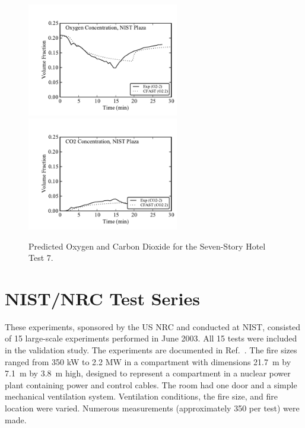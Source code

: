 \begin{figure}[p]
\begin{center}
\includegraphics[width=2.6in]{FIGURES/NIST_PLAZA/Room_2_Oxygen} \\
\includegraphics[width=2.6in]{FIGURES/NIST_PLAZA/Room_2_CO2} 
\end{center}
\caption{Predicted Oxygen and Carbon Dioxide for the Seven-Story Hotel Test 7.} \label{fig:NIST_PLAZA_Gases}
\end{figure}

\clearpage

\section{NIST/NRC Test Series}

These experiments, sponsored by the US NRC and conducted at NIST, consisted of 15 large-scale experiments performed in June 2003. All 15 tests were included in the validation study. The experiments are documented in Ref.~\cite{Hamins:2005}. The fire sizes ranged from 350 kW to 2.2 MW in a compartment with dimensions 21.7~m by 7.1~m by 3.8~m high, designed to represent a compartment in a nuclear power plant containing power and control cables. The room had one door and a simple mechanical ventilation system. Ventilation conditions, the fire size, and fire location were varied. Numerous measurements (approximately 350 per test) were made. 

